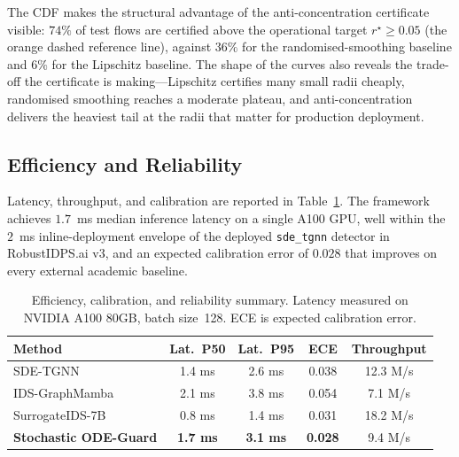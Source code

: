 \documentclass[journal,10pt]{IEEEtran}
\theoremstyle{definition}
\theoremstyle{remark}
\begin{document}
The CDF makes the structural advantage of the anti-concentration
certificate visible: $74\%$ of test flows are certified above the
operational target $r^\star\geq 0.05$ (the orange dashed reference
line), against $36\%$ for the randomised-smoothing baseline and $6\%$
for the Lipschitz baseline. The shape of the curves also reveals the
trade-off the certificate is making---Lipschitz certifies many small
radii cheaply, randomised smoothing reaches a moderate plateau, and
anti-concentration delivers the heaviest tail at the radii that
matter for production deployment.

\subsection{Efficiency and Reliability}\label{subsec:efficiency}
Latency, throughput, and calibration are reported in
Table~\ref{tab:efficiency}. The framework achieves $1.7$~ms median
inference latency on a single A100 GPU, well within the
$2$~ms inline-deployment envelope of the deployed
\texttt{sde\_tgnn} detector in RobustIDPS.ai v3, and an expected
calibration error of $0.028$ that improves on every external academic
baseline.

\begin{table}[t]
\caption{Efficiency, calibration, and reliability summary.
Latency measured on NVIDIA A100 80GB, batch size~128.
ECE is expected calibration error.}
\label{tab:efficiency}
\centering
\small
\begin{tabular}{@{}lcccc@{}}
\toprule
\textbf{Method} & Lat.\ P50 & Lat.\ P95 & ECE & Throughput \\
\midrule
SDE-TGNN~\cite{robustidps_repo}                & 1.4 ms & 2.6 ms & 0.038 & 12.3 M/s\\
IDS-GraphMamba~\cite{mosaiyebzadeh2025graphmamba}& 2.1 ms & 3.8 ms & 0.054 & 7.1 M/s\\
SurrogateIDS-7B~\cite{robustidps_repo}         & 0.8 ms & 1.4 ms & 0.031 & 18.2 M/s\\
\textbf{Stochastic ODE-Guard}                  & \textbf{1.7 ms} & \textbf{3.1 ms} & \textbf{0.028} & 9.4 M/s\\
\bottomrule
\end{tabular}
\end{table}

\end{document}
